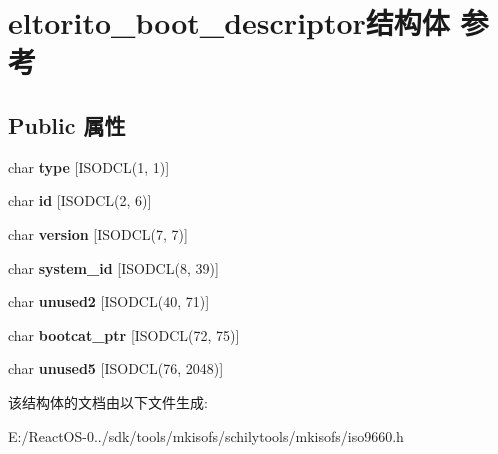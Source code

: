 \hypertarget{structeltorito__boot__descriptor}{}\section{eltorito\+\_\+boot\+\_\+descriptor结构体 参考}
\label{structeltorito__boot__descriptor}
\subsection*{Public 属性}
\begin{DoxyCompactItemize}
\item 
\mbox{\label{structeltorito__boot__descriptor_a4246007211ba082e45450ac35be78318}} 
char {\bfseries type} \mbox{[}I\+S\+O\+D\+CL(1, 1)\mbox{]}
\item 
\mbox{\label{structeltorito__boot__descriptor_a1185da49fc15ceaf364be0094679cadc}} 
char {\bfseries id} \mbox{[}I\+S\+O\+D\+CL(2, 6)\mbox{]}
\item 
\mbox{\label{structeltorito__boot__descriptor_a0e548275f5bf6a10b24c891361e280de}} 
char {\bfseries version} \mbox{[}I\+S\+O\+D\+CL(7, 7)\mbox{]}
\item 
\mbox{\label{structeltorito__boot__descriptor_a56022802ca70428c334efb70ed606b4a}} 
char {\bfseries system\+\_\+id} \mbox{[}I\+S\+O\+D\+CL(8, 39)\mbox{]}
\item 
\mbox{\label{structeltorito__boot__descriptor_a44ba6f486ff16792b075dfe617c63569}} 
char {\bfseries unused2} \mbox{[}I\+S\+O\+D\+CL(40, 71)\mbox{]}
\item 
\mbox{\label{structeltorito__boot__descriptor_abc2dfc7f87015d5b74e12f6775a90426}} 
char {\bfseries bootcat\+\_\+ptr} \mbox{[}I\+S\+O\+D\+CL(72, 75)\mbox{]}
\item 
\mbox{\label{structeltorito__boot__descriptor_ae94ee7a2a5d148132316aa983677fe5f}} 
char {\bfseries unused5} \mbox{[}I\+S\+O\+D\+CL(76, 2048)\mbox{]}
\end{DoxyCompactItemize}


该结构体的文档由以下文件生成\+:\begin{DoxyCompactItemize}
\item 
E\+:/\+React\+O\+S-\/0../sdk/tools/mkisofs/schilytools/mkisofs/iso9660.\+h\end{DoxyCompactItemize}
